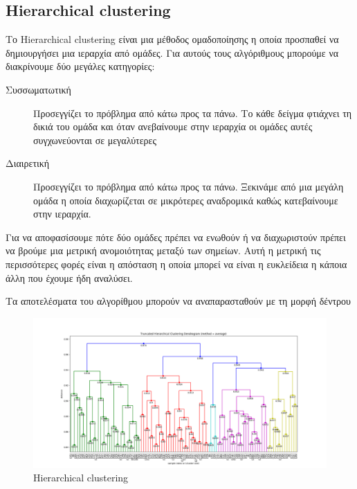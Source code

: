 \subsection{\textlatin{Hierarchical clustering}}
Το \textlatin{Hierarchical clustering} είναι μια μέθοδος ομαδοποίησης η οποία προσπαθεί να δημιουργήσει μια ιεραρχία από ομάδες. Για αυτούς τους αλγόριθμους μπορούμε να διακρίνουμε δύο μεγάλες
κατηγορίες\cite{wkhc}:
\begin{description}
    \item[Συσσωματωτική] Προσεγγίζει το πρόβλημα από κάτω προς τα πάνω. Το κάθε δείγμα φτιάχνει τη δικιά του ομάδα και όταν ανεβαίνουμε στην ιεραρχία οι ομάδες αυτές συγχωνεύονται σε μεγαλύτερες
    \item[Διαιρετική] Προσεγγίζει το πρόβλημα από κάτω προς τα πάνω. Ξεκινάμε από μια μεγάλη ομάδα η οποία διαχωρίζεται σε μικρότερες αναδρομικά καθώς κατεβαίνουμε στην ιεραρχία.
\end{description}
Για να αποφασίσουμε πότε δύο ομάδες πρέπει να ενωθούν ή να διαχωριστούν πρέπει να βρούμε μια μετρική ανομοιότητας μεταξύ των σημείων. Αυτή η μετρική τις περισσότερες φορές είναι η απόσταση η οποία μπορεί να είναι η ευκλείδεια η κάποια άλλη που έχουμε ήδη αναλύσει.\par
Τα αποτελέσματα του αλγορίθμου μπορούν να αναπαρασταθούν με τη μορφή δέντρου
\begin{figure}[H]
    \centering
    \includegraphics[width=1\textwidth]{images/hierarchical_clustering.png}
    \caption{\textlatin{Hierarchical clustering}}
\end{figure}
